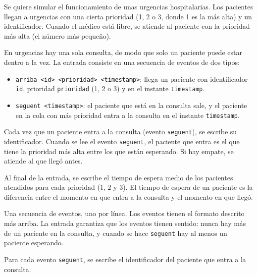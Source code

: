 

\Statement

Se quiere simular el funcionamiento de unas urgencias
hospitalarias. Los pacientes llegan a urgencias con una cierta
prioridad (1, 2 o 3, donde 1 es la más alta) y un identificador.
Cuando el médico está libre, se atiende al paciente con la
prioridad más alta (el número más pequeño).

\medskip

En urgencias hay una sola consulta, de modo que solo un paciente
puede estar dentro a la vez. La entrada consiste en una secuencia
de eventos de dos tipos:

\begin{itemize}

\item \verb|arriba <id> <prioridad> <timestamp>|: llega un
paciente con identificador \verb|id|, prioridad \verb|prioridad|
(1, 2 o 3) y en el instante \verb|timestamp|.

\item \verb|seguent <timestamp>|: el paciente que está en la
consulta sale, y el paciente en la cola con más prioridad
entra a la consulta en el instante \verb|timestamp|.

\end{itemize}

\medskip

Cada vez que un paciente entra a la consulta (evento
\verb|seguent|), se escribe su identificador. Cuando se lee el
evento \verb|seguent|, el paciente que entra es el que tiene la
prioridad más alta entre los que están esperando. Si hay empate,
se atiende al que llegó antes.

\medskip

Al final de la entrada, se escribe el tiempo de espera medio de
los pacientes atendidos para cada prioridad (1, 2 y 3). El tiempo
de espera de un paciente es la diferencia entre el momento en que
entra a la consulta y el momento en que llegó.

\Input

Una secuencia de eventos, uno por línea. Los eventos tienen el
formato descrito más arriba. La entrada garantiza que los eventos
tienen sentido: nunca hay más de un paciente en la consulta, y
cuando se hace \verb|seguent| hay al menos un paciente esperando.

\Output

Para cada evento \verb|seguent|, se escribe el identificador del
paciente que entra a la consulta.

